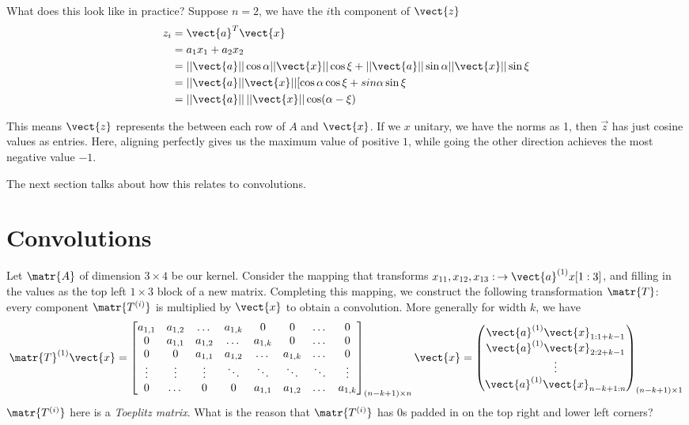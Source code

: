 What does this look like in practice?
Suppose $n=2$, we have the $i$th component of $\vect{z}$ 
\begin{align}
z_i & = \vect{a}^T\vect{x} \\
& = a_1x_1 + a_2x_2 \\
&= ||\vect{a}|| \cos \alpha ||\vect{x}|| \cos\xi + ||\vect{a}|| \sin \alpha  ||\vect{x}|| \sin\xi \\
&= ||\vect{a}||\vect{x}|| [\cos\alpha \cos\xi + sin\alpha \sin\xi \\
&=||\vect{a}||\,||\vect{x}||\cos(\alpha-\xi)
\end{align}


This means $\vect{z}$ represents the  between each row of $A$ and $\vect{x}$. If we $x$ unitary, we have the norms as 1, then $\vec{z}$ has just cosine values as entries. Here, aligning perfectly gives us the maximum value of positive $1$, while going the other direction achieves the most negative value $-1$.

The next section talks about how this relates to convolutions.
\section{Convolutions}
Let $\matr{A}$ of dimension $3\times 4$ be our kernel. Consider the mapping that transforms $x_{11}, x_{12}, x_{13}:\, \to \vect{a}^{(1)} x[1:3]$, and filling in the values as the top left $1\times 3$ block of a new matrix. Completing this mapping, we construct the following transformation $\matr{T}$: every component $\matr{T^{(i)}}$ is multiplied by $\vect{x}$ to obtain a convolution. More generally for width $k$, we have
\[
\matr{T}^{(1)}\vect{x} =
\begin{bmatrix}
    a_{1,1} & a_{1,2} & \dotsc & a_{1,k} & 0 & 0 & \dotsc & 0 \\
    0 & a_{1,1} & a_{1,2} & \dotsc & a_{1,k} & 0 & \dotsc & 0 \\
    0 & 0 & a_{1,1} & a_{1,2} & \dotsc & a_{1,k} & \dotsc & 0 \\
    \vdots & \vdots & \vdots & \ddots & \ddots & \ddots & \ddots & \vdots \\
    0 & \dotsc & 0 & 0 & a_{1,1} & a_{1,2} & \dotsc & a_{1,k}
\end{bmatrix}_{(n-k+1) \times n} \vect{x}=
\begin{pmatrix}
    \vect{a}^{(1)} \vect{x}_{1:1+k-1} \\ \vect{a}^{(1)} \vect{x}_{2:2+k-1} \\ \vdots \\ \vect{a}^{(1)}  \vect{x}_{n-k+1:n}
\end{pmatrix}_{(n-k+1) \times 1}
\]
$\matr{T^{(i)}}$ here is a \textit{Toeplitz matrix}. What is the reason that $\matr{T^{(i)}}$ has $0$s padded in on the top right and lower left corners?

